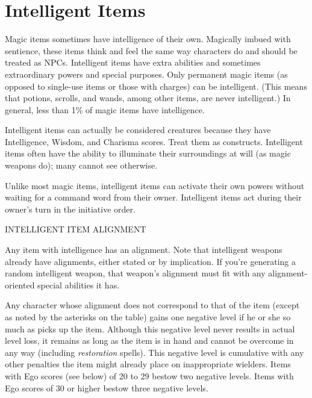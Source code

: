 \section{Intelligent Items}

Magic items sometimes have intelligence of their own. Magically imbued with sentience, 
these items think and feel the same way characters do and should be treated as 
NPCs. Intelligent items have extra abilities and sometimes extraordinary powers 
and special purposes. Only permanent magic items (as opposed to single-use items 
or those with charges) can be intelligent. (This means that potions, scrolls, and 
wands, among other items, are never intelligent.) In general, less than 1\% of 
magic items have intelligence.

Intelligent items can actually be considered creatures because they have Intelligence, 
Wisdom, and Charisma scores. Treat them as constructs. Intelligent items often 
have the ability to illuminate their surroundings at will (as magic weapons do); 
many cannot see otherwise.

Unlike most magic items, intelligent items can activate their own powers without 
waiting for a command word from their owner. Intelligent items act during their 
owner's turn in the initiative order.

\vspace{12pt}
INTELLIGENT ITEM ALIGNMENT

Any item with intelligence has an alignment. Note that intelligent weapons already 
have alignments, either stated or by implication.  If you're generating a random 
intelligent weapon, that weapon's alignment must fit with any alignment-oriented 
special abilities it has.

Any character whose alignment does not correspond to that of the item (except as 
noted by the asterisks on the table) gains one negative level if he or she so much 
as picks up the item. Although this negative level never results in actual level 
loss, it remains as long as the item is in hand and cannot be overcome in any way 
(including \textit{restoration }spells). This negative level is cumulative with 
any other penalties the item might already place on inappropriate wielders. Items 
with Ego scores (see below) of 20 to 29 bestow two negative levels. Items with 
Ego scores of 30 or higher bestow three negative levels.

